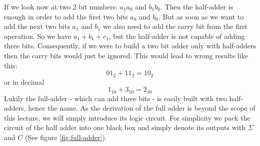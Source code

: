 \documentclass[10pt,a4paper]{article}
\begin{document}
If we look now at two 2 bit numbers: $a_1a_0$ and $b_1b_0$. Then the half-adder is enough in order to add the first two bits $a_0$ and $b_0$. But as soon as we want to add the next two bits $a_1$ and $b_1$ we also need to add the carry bit from the first operation. So we have $a_1+b_1+c_1$, but the half-adder is not capable of adding three bits. Consequently, if we were to build a two bit adder only with half-adders then the carry bits would just be ignored. This would lead to wrong results like this:
\[
01_2 + 11_2 = 10_2
\]
or in decimal
\[
1_{10} + 3_{10} = 2_{10}
\]
Lukily the full-adder - which can add three bits - is easily built with two half-adders, hence the name. As the derivation of the full adder is beyond the scope of this lecture, we will simply introduce its logic circuit. For simplicity we pack the circuit of the half adder into one black box and simply denote its outputs with $\Sigma$ and $C$ (See figure \ref{fig:full-adder}).
\end{document}
